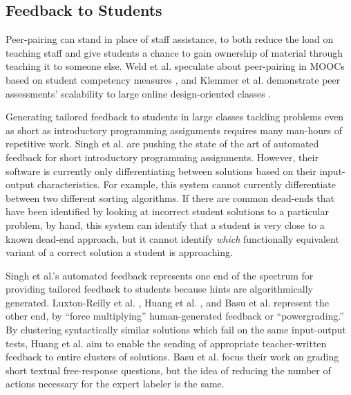 \documentclass[12pt]{article}
\begin{document}
\subsection{Feedback to Students}

Peer-pairing can stand in place of staff assistance, to both reduce the load on teaching staff and give students a chance to gain ownership of material through teaching it to someone else. Weld et al. speculate about peer-pairing in MOOCs based on student competency measures \cite{WeldHcomp12}, and Klemmer et al. demonstrate peer assessments' scalability to large online design-oriented classes \cite{Klemmer}.

Generating tailored feedback to students in large classes tackling problems even as short as introductory programming assignments requires many man-hours of repetitive work. Singh et al. \cite{rishabh} are pushing the state of the art of automated feedback for short introductory programming assignments. However, their software is currently only differentiating between solutions based on their input-output characteristics. For example, this system cannot currently differentiate between two different sorting algorithms. If there are common dead-ends that have been identified by looking at incorrect student solutions to a particular problem, by hand, this system can identify that a student is very close to a known dead-end approach, but it cannot identify {\em which} functionally equivalent variant of a correct solution a student is approaching. 

Singh et al.'s automated feedback represents one end of the spectrum for providing tailored feedback to students because hints are algorithmically generated. Luxton-Reilly et al. \cite{Luxton13}, Huang et al. \cite{MOOCshop}, and Basu et al. \cite{basupowergrading} represent the other end, by ``force multiplying'' human-generated feedback or ``powergrading.'' By clustering syntactically similar solutions which fail on the same input-output tests, Huang et al. aim to enable the sending of appropriate teacher-written feedback to entire clusters of solutions. Basu et al. \cite{basupowergrading} focus their work on grading short textual free-response questions, but the idea of reducing the number of actions necessary for the expert labeler is the same.

%
\end{document}
